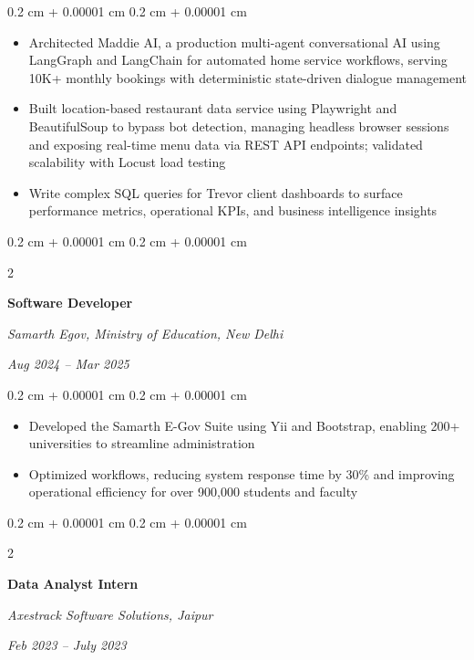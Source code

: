 \documentclass[10pt, letterpaper]{article}
\newenvironment{highlights}{
    \begin{itemize}[
        topsep=0.10 cm,
        parsep=0.10 cm,
        partopsep=0pt,
        itemsep=0pt,
        leftmargin=0.4 cm + 10pt
    ]
}{
    \end{itemize}
}
\newenvironment{onecolentry}{
    \begin{adjustwidth}{
        0.2 cm + 0.00001 cm
    }{
        0.2 cm + 0.00001 cm
    }
}{
    \end{adjustwidth}
}
\newenvironment{twocolentry}[2][]{
    \onecolentry
    \def\secondColumn{#2}
    \setcolumnwidth{\fill, 4.5 cm}
    \begin{paracol}{2}
}{
    \switchcolumn \raggedleft \secondColumn
    \end{paracol}
    \endonecolentry
}
\begin{document}
        \vspace{0.10 cm}
        \begin{onecolentry}
            \begin{highlights}
                \item Architected Maddie AI, a production multi-agent conversational AI using LangGraph and LangChain for automated home service workflows, serving 10K+ monthly bookings with deterministic state-driven dialogue management
                \item Built location-based restaurant data service using Playwright and BeautifulSoup to bypass bot detection, managing headless browser sessions and exposing real-time menu data via REST API endpoints; validated scalability with Locust load testing
                \item Write complex SQL queries for Trevor client dashboards to surface performance metrics, operational KPIs, and business intelligence insights
            \end{highlights}
        \end{onecolentry}

        \vspace{0.2 cm}

        \begin{twocolentry}{\textit{Aug 2024 – Mar 2025}}
            \textbf{Software Developer}
            
            \textit{Samarth Egov, Ministry of Education, New Delhi}
        \end{twocolentry}

        \vspace{0.10 cm}
        \begin{onecolentry}
            \begin{highlights}  
                 \item Developed the Samarth E-Gov Suite using Yii and Bootstrap, enabling 200+ universities to streamline administration
                \item Optimized workflows, reducing system response time by 30\% and improving operational efficiency for over 900,000 students and faculty  
            \end{highlights}
        \end{onecolentry}

        \vspace{0.2 cm}

        \begin{twocolentry}{\textit{Feb 2023 – July 2023}}
            \textbf{Data Analyst Intern}
            
            \textit{Axestrack Software Solutions, Jaipur}
        \end{twocolentry}
\end{document}

